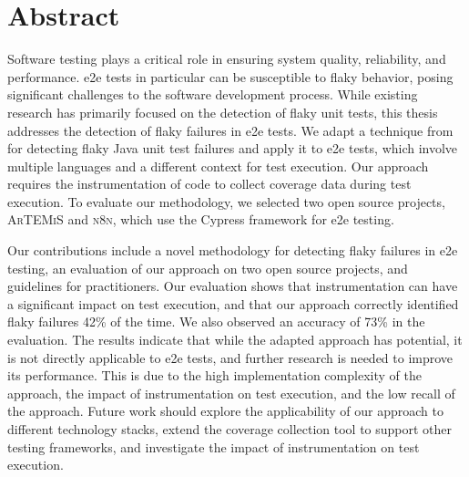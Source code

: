 \chapter*{Abstract}

Software testing plays a critical role in ensuring system quality, reliability, and performance. 
\acf*{e2e} tests in particular can be susceptible to flaky behavior, posing significant challenges to the software development process. 
While existing research has primarily focused on the detection of flaky unit tests, this thesis addresses the detection of flaky failures in \acf*{e2e} tests. 
We adapt a technique from \citeauthor*{bell_deflaker_2018} for detecting flaky Java unit test failures and apply it to \ac*{e2e} tests, which involve multiple languages and a different context for test execution. Our approach requires the instrumentation of code to collect coverage data during test execution. 
To evaluate our methodology, we selected two open source projects, \textsc{ArTEMiS} and \textsc{n8n}, which use the Cypress framework for \ac*{e2e} testing.

Our contributions include a novel methodology for detecting flaky failures in \ac*{e2e} testing, an evaluation of our approach on two open source projects, and guidelines for practitioners. 
Our evaluation shows that instrumentation can have a significant impact on test execution, and that our approach correctly identified flaky failures 42\% of the time. 
We also observed an accuracy of 73\% in the evaluation. 
The results indicate that while the adapted approach has potential, it is not directly applicable to \ac*{e2e} tests, and further research is needed to improve its performance. 
This is due to the high implementation complexity of the approach, the impact of instrumentation on test execution, and the low recall of the approach.
Future work should explore the applicability of our approach to different technology stacks, extend the coverage collection tool to support other testing frameworks, and investigate the impact of instrumentation on test execution.